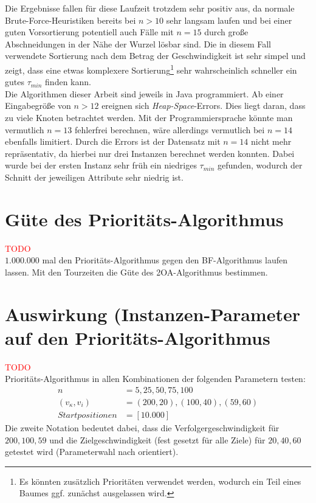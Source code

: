 \documentclass[german,version-2019-11]{uzl-thesis}
\begin{document}
Die Ergebnisse fallen für diese Laufzeit trotzdem sehr positiv aus, da normale Brute-Force-Heuristiken bereits bei $n>10$ sehr langsam laufen und bei einer guten Vorsortierung potentiell auch Fälle mit $n=15$ durch große Abschneidungen in der Nähe der Wurzel lösbar sind. Die in diesem Fall verwendete Sortierung nach dem Betrag der Geschwindigkeit ist sehr simpel und zeigt, dass eine etwas komplexere Sortierung\footnote{Es könnten zusätzlich Prioritäten verwendet werden, wodurch ein Teil eines Baumes ggf. zunächst ausgelassen wird.} sehr wahrscheinlich schneller ein gutes $\tau_{min}$ finden kann. \\
Die Algorithmen dieser Arbeit sind jeweils in Java programmiert. Ab einer Eingabegröße von $n>12$ ereignen sich \emph{Heap-Space}-Errors. Dies liegt daran, dass zu viele Knoten betrachtet werden. Mit der Programmiersprache könnte man vermutlich $n=13$ fehlerfrei berechnen, wäre allerdings vermutlich bei $n=14$ ebenfalls limitiert. Durch die Errors ist der Datensatz mit $n=14$ nicht mehr repräsentativ, da hierbei nur drei Instanzen berechnet werden konnten. Dabei wurde bei der ersten Instanz sehr früh ein niedriges $\tau_{min}$ gefunden, wodurch der Schnitt der jeweiligen Attribute sehr niedrig ist.   


\section{Güte des Prioritäts-Algorithmus}
\textcolor{red}{TODO}\\
$1.000.000$ mal den Prioritäts-Algorithmus gegen den BF-Algorithmus laufen lassen. Mit den Tourzeiten die Güte des 2OA-Algorithmus bestimmen.

\section{Auswirkung (Instanzen-Parameter auf den Prioritäts-Algorithmus}
\textcolor{red}{TODO}\\
Prioritäts-Algorithmus in allen Kombinationen der folgenden Parametern testen:
\begin{align*}
n&=5,25,50,75,100\\
(v_{\kappa},v_i)&=(200,20),(100,40),(59,60)\\
Startpositionen&=[10.000]
\end{align*}
Die zweite Notation bedeutet dabei, dass die Verfolgergeschwindigkeit für $200,100,59$ und die Zielgeschwindigkeit (fest gesetzt für alle Ziele) für $20,40,60$ getestet wird (Parameterwahl nach \cite{stieber2015multiple} orientiert).
\end{document}
